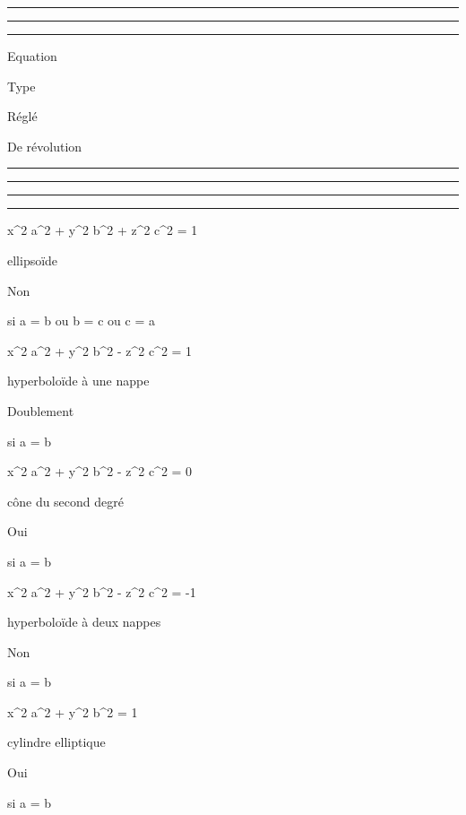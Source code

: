 \documentclass[]{article}
\begin{document}
\begin{center}\rule{3in}{0.4pt}\end{center}

\begin{center}\rule{3in}{0.4pt}\end{center}

\begin{center}\rule{3in}{0.4pt}\end{center}

Equation

Type

Réglé

De révolution

\begin{center}\rule{3in}{0.4pt}\end{center}

\begin{center}\rule{3in}{0.4pt}\end{center}

\begin{center}\rule{3in}{0.4pt}\end{center}

\begin{center}\rule{3in}{0.4pt}\end{center}

 x^2 \over a^2 +
y^2 \over b^2 + z^2
\over c^2 = 1

ellipsoïde

Non

si a = b ou b = c ou c = a

 x^2 \over a^2 +
y^2 \over b^2 - z^2
\over c^2 = 1

hyperboloïde à une nappe

Doublement

si a = b

 x^2 \over a^2 +
y^2 \over b^2 - z^2
\over c^2 = 0

cône du second degré

Oui

si a = b

 x^2 \over a^2 +
y^2 \over b^2 - z^2
\over c^2 = -1

hyperboloïde à deux nappes

Non

si a = b

 x^2 \over a^2 +
y^2 \over b^2 = 1

cylindre elliptique

Oui

si a = b
\end{document}
